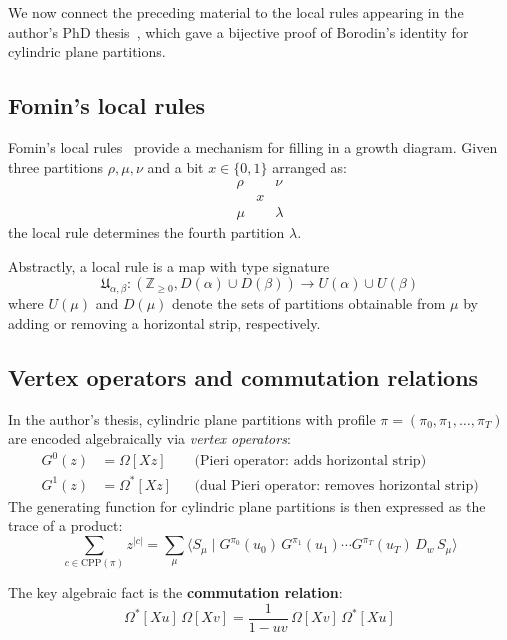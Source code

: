 \documentclass[12pt]{article}
\begin{document}
We now connect the preceding material to the local rules appearing in the
author's PhD thesis~\cite{Langer2013}, which gave a bijective proof of
Borodin's identity for cylindric plane partitions.

\subsection{Fomin's local rules}

Fomin's local rules~\cite{Fomin1988} provide a mechanism for filling in
a growth diagram. Given three partitions $\rho, \mu, \nu$ and a bit
$x \in \{0,1\}$ arranged as:
\[
  \begin{array}{ccc}
    \rho & & \nu \\
    & x & \\
    \mu & & \lambda
  \end{array}
\]
the local rule determines the fourth partition $\lambda$.

Abstractly, a local rule is a map with type signature
\begin{equation} \label{eq:local-rule}
  \mathfrak{U}_{\alpha,\beta} :
    (\mathbb{Z}_{\ge 0}, D(\alpha) \cup D(\beta))
    \to U(\alpha) \cup U(\beta)
\end{equation}
where $U(\mu)$ and $D(\mu)$ denote the sets of partitions obtainable from
$\mu$ by adding or removing a horizontal strip, respectively.

\subsection{Vertex operators and commutation relations}

In the author's thesis, cylindric plane partitions with profile
$\pi = (\pi_0, \pi_1, \ldots, \pi_T)$ are encoded algebraically via
\emph{vertex operators}:
\begin{align}
  G^0(z) &= \Omega[Xz] && \text{(Pieri operator: adds horizontal strip)} \\
  G^1(z) &= \Omega^*[Xz] && \text{(dual Pieri operator: removes horizontal strip)}
\end{align}
The generating function for cylindric plane partitions is then expressed as
the trace of a product:
\[
  \sum_{c \in \mathrm{CPP}(\pi)} z^{|c|}
    = \sum_\mu \langle S_\mu \mid G^{\pi_0}(u_0)\, G^{\pi_1}(u_1)
      \cdots G^{\pi_T}(u_T)\, D_w\, S_\mu \rangle
\]

The key algebraic fact is the \textbf{commutation relation}:
\begin{equation} \label{eq:commutation}
  \boxed{\Omega^*[Xu]\, \Omega[Xv]
    = \frac{1}{1-uv}\, \Omega[Xv]\, \Omega^*[Xu]}
\end{equation}
\end{document}
